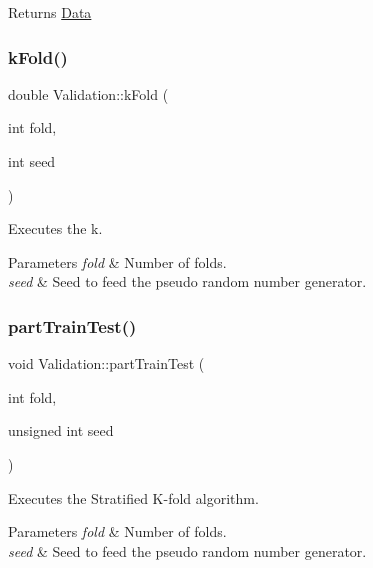 \begin{DoxyReturn}{Returns}
\hyperlink{class_data}{Data} 
\end{DoxyReturn}
\mbox{\label{class_validation_a3aae72caef37b12a57aaf5cdd862de3a}} 
\subsubsection{\texorpdfstring{k\+Fold()}{kFold()}}
{\footnotesize\ttfamily double Validation\+::k\+Fold (\begin{DoxyParamCaption}\item[{int}]{fold,  }\item[{int}]{seed }\end{DoxyParamCaption})}



Executes the k. 


\begin{DoxyParams}{Parameters}
{\em fold} & Number of folds. \\
\hline
{\em seed} & Seed to feed the pseudo random number generator. \\
\hline
\end{DoxyParams}
\mbox{\label{class_validation_a83b3cc552927fe8595f3cdd143d645c0}} 
\subsubsection{\texorpdfstring{part\+Train\+Test()}{partTrainTest()}}
{\footnotesize\ttfamily void Validation\+::part\+Train\+Test (\begin{DoxyParamCaption}\item[{int}]{fold,  }\item[{unsigned int}]{seed }\end{DoxyParamCaption})}



Executes the Stratified K-\/fold algorithm. 


\begin{DoxyParams}{Parameters}
{\em fold} & Number of folds. \\
\hline
{\em seed} & Seed to feed the pseudo random number generator. \\
\hline
\end{DoxyParams}
\mbox{\label{class_validation_a166305aa3f117b119da69d54778286a0}} 
